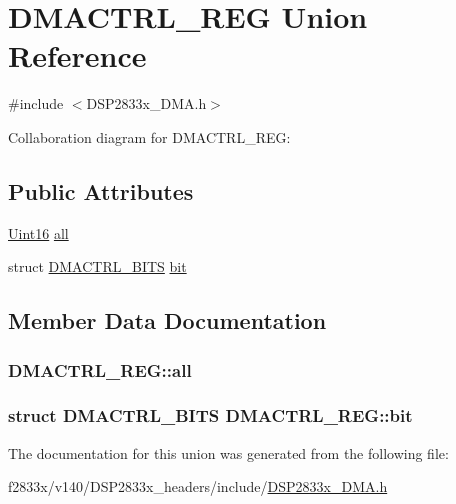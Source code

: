 \hypertarget{union_d_m_a_c_t_r_l___r_e_g}{}\section{D\+M\+A\+C\+T\+R\+L\+\_\+\+R\+E\+G Union Reference}
\label{union_d_m_a_c_t_r_l___r_e_g}


{\ttfamily \#include $<$D\+S\+P2833x\+\_\+\+D\+M\+A.\+h$>$}



Collaboration diagram for D\+M\+A\+C\+T\+R\+L\+\_\+\+R\+E\+G\+:
\subsection*{Public Attributes}
\begin{DoxyCompactItemize}
\item 
\hyperlink{_d_s_p2833x___device_8h_a59a9f6be4562c327cbfb4f7e8e18f08b}{Uint16} \hyperlink{union_d_m_a_c_t_r_l___r_e_g_a3300c859a8d946639277f8b607cd3a2c}{all}
\item 
struct \hyperlink{struct_d_m_a_c_t_r_l___b_i_t_s}{D\+M\+A\+C\+T\+R\+L\+\_\+\+B\+I\+T\+S} \hyperlink{union_d_m_a_c_t_r_l___r_e_g_af21b843f7a5818185c5035b667677443}{bit}
\end{DoxyCompactItemize}


\subsection{Member Data Documentation}
\hypertarget{union_d_m_a_c_t_r_l___r_e_g_a3300c859a8d946639277f8b607cd3a2c}{}
\subsubsection[{all}]{ D\+M\+A\+C\+T\+R\+L\+\_\+\+R\+E\+G\+::all}\label{union_d_m_a_c_t_r_l___r_e_g_a3300c859a8d946639277f8b607cd3a2c}
\hypertarget{union_d_m_a_c_t_r_l___r_e_g_af21b843f7a5818185c5035b667677443}{}
\subsubsection[{bit}]{\setlength{\rightskip}{0pt plus 5cm}struct {\bf D\+M\+A\+C\+T\+R\+L\+\_\+\+B\+I\+T\+S} D\+M\+A\+C\+T\+R\+L\+\_\+\+R\+E\+G\+::bit}\label{union_d_m_a_c_t_r_l___r_e_g_af21b843f7a5818185c5035b667677443}


The documentation for this union was generated from the following file\+:\begin{DoxyCompactItemize}
\item 
f2833x/v140/\+D\+S\+P2833x\+\_\+headers/include/\hyperlink{_d_s_p2833x___d_m_a_8h}{D\+S\+P2833x\+\_\+\+D\+M\+A.\+h}\end{DoxyCompactItemize}
